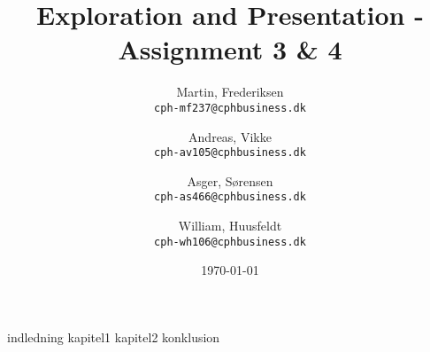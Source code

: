 \documentclass[10pt]{report}
\title{Exploration and Presentation - Assignment 3 \& 4}
\author{
    Martin, Frederiksen\\
    \texttt{cph-mf237@cphbusiness.dk}\\
    \and
    Andreas, Vikke\\
    \texttt{cph-av105@cphbusiness.dk}\\
    \and
    Asger, Sørensen\\
    \texttt{cph-as466@cphbusiness.dk}\\
    \and
    William, Huusfeldt\\
    \texttt{cph-wh106@cphbusiness.dk}\\
  }
\date{\today}
\begin{document}
\hypersetup{pageanchor=false}
\begin{titlepage}
\maketitle
\end{titlepage}

\hypersetup{pageanchor=true}
\tableofcontents
\newpage
{indledning}
{kapitel1}
{kapitel2}
{konklusion}
\end{document}
